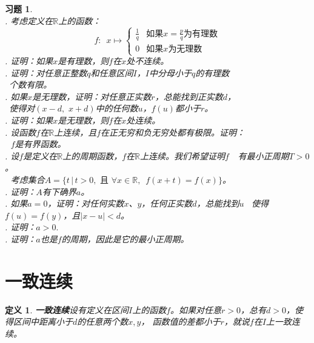 \documentclass[12pt,UTF8]{ctexbook}
\newtheorem{df}{定义}[section]
\newtheorem{xt}{习题}[section]
\begin{document}
\begin{appendix}
\begin{xt}
    \mbox{} \\
    . 考虑定义在$\mathbb{R}$上的函数：
    $$ f: \,\,\, x\mapsto \left\{
    \begin{array}{cl}
        \frac{1}{q} & \mbox{如果}x = \frac{p}{q}\mbox{为有理数} \\
        0           & \mbox{如果}x\mbox{为无理数} 
    \end{array}\right.
    $$
    . 证明：如果$x$是有理数，则$f$在$x$处不连续。\\
    . 证明：对任意正整数$q$和任意区间$I$，$I$中分母小于$q$的有理数\\
    \indent\quad\;\;\, 个数有限。\\
    . 如果$x$是无理数，证明：对任意正实数$r$，总能找到正实数$d$，\\
    \indent\quad\;\;\, 使得对$(x - d,\,\, x + d)$中的任何数$u$，$f(u)$都小于$r$。\\
    . 证明：如果$x$是无理数，则$f$在$x$处连续。\\
    . 设函数$f$在$\mathbb{R}$上连续，且$f$在正无穷和负无穷处都有极限。证明：\\
    \indent\;\;\,\, $f$是有界函数。\\
    . 设$f$是定义在$\mathbb{R}$上的周期函数，$f$在$\mathbb{R}$上连续。我们希望证明$f$
    \indent\;\;\,\, 有最小正周期$T>0$。\\
    \indent\;\;\,\, 考虑集合$A = \{t \, | \, t > 0,\,\, \mbox{且}\,\,\forall x\in\mathbb{R},\,\,\, f(x+t) = f(x)\}$。\\
    . 证明：$A$有下确界$a$。\\
    . 如果$a = 0$，证明：对任何实数$x$、$y$，任何正实数$d$，总能找到$u$
    \indent\quad\;\;\, 使得$f(u) = f(y)$，且$|x - u| < d$。\\
    . 证明：$a > 0.$\\
    . 证明：$a$也是$f$的周期，因此是它的最小正周期。
\end{xt}

\section{一致连续}

\begin{df}{\textbf{一致连续}}\label{df:b-2-10}
    设有定义在区间$I$上的函数$f$。如果对任意$r>0$，总有$d>0$，使得区间中距离小于$d$的任意两个数$x,y$，
    函数值的差都小于$r$，就说$f$在$I$上一致连续。
\end{df}


\end{appendix}
\end{document}
